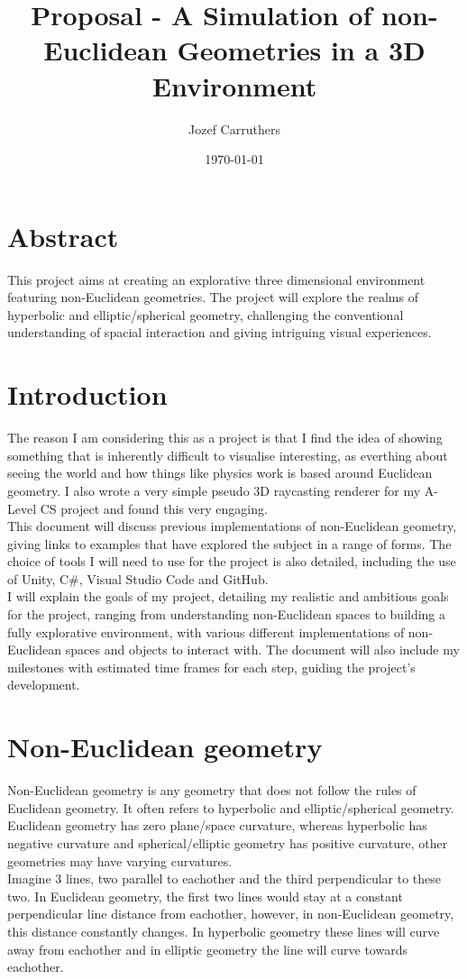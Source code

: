 \documentclass[]{article}
\author{Jozef Carruthers}
\date{\today}
\title{Proposal - A Simulation of non-Euclidean Geometries in a 3D Environment}
\begin{document}
    \maketitle
    \tableofcontents
    \newpage
    \section{Abstract}
        This project aims at creating an explorative three dimensional environment featuring non-Euclidean geometries. 
        The project will explore the realms of hyperbolic and elliptic/spherical geometry, challenging the conventional 
        understanding of spacial interaction and giving intriguing visual experiences.

    \section{Introduction}
        The reason I am considering this as a project is that I find the idea of showing something that is inherently 
        difficult to visualise interesting, as everthing about seeing the world and how things like 
        physics work is based around Euclidean geometry. I also wrote a very simple pseudo 3D raycasting renderer 
        for my A-Level CS project and found this very engaging. \\
        This document will discuss previous implementations of non-Euclidean geometry, giving links to examples that have 
        explored the subject in a range of forms. The choice of tools I will need to use for the project is also detailed, 
        including the use of Unity, C\#, Visual Studio Code and GitHub. \\
        I will explain the goals of my project, detailing my realistic and ambitious goals for the project, ranging from 
        understanding non-Euclidean spaces to building a fully explorative environment, with various different implementations of 
        non-Euclidean spaces and objects to interact with. The document will also include my milestones with estimated time frames 
        for each step, guiding the project's development.

    \newpage
    \section{Non-Euclidean geometry}
        Non-Euclidean geometry is any geometry that does not follow the rules of Euclidean geometry. It often refers to 
        hyperbolic and elliptic/spherical geometry. Euclidean geometry has zero plane/space curvature, 
        whereas hyperbolic has negative curvature and spherical/elliptic geometry has positive curvature, 
        other geometries may have varying curvatures. \\
        Imagine 3 lines, two parallel to eachother and the third perpendicular to these two. In Euclidean geometry, 
        the first two lines would stay at a constant perpendicular line distance from eachother, however, 
        in non-Euclidean geometry, this distance constantly changes. In hyperbolic geometry these lines will 
        curve away from eachother and in elliptic geometry the line will curve towards eachother.
\end{document}
